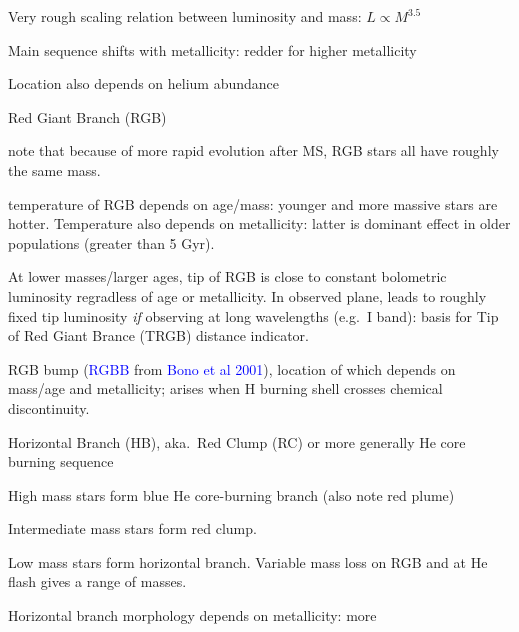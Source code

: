 \documentclass[12pt]{article}
\begin{document}
\begin{itemize*}
        \begin{itemize*}
            \item Very rough scaling relation between luminosity and mass:
                $ L \propto M^{3.5} $
            \item Main sequence shifts with metallicity: redder for
                higher metallicity
            \item Location also depends on helium abundance
        \end{itemize*}
    \item Red Giant Branch (RGB)
        \begin{itemize*}
            \item note that because of more rapid evolution after MS,
                RGB stars all have roughly the same mass.
            \item temperature of RGB depends on age/mass: younger and more
                massive stars are hotter. Temperature also depends on
                metallicity: latter is dominant effect in older populations
                (greater than 5 Gyr).
            \item At lower masses/larger ages, tip of RGB is close to
                constant bolometric luminosity regradless of age or
                metallicity. In observed plane, leads to roughly fixed
                tip luminosity \emph{if} observing at long wavelengths
                (e.g.\ I band): basis for Tip of Red Giant Brance (TRGB)
                distance indicator.
            \item RGB bump (\textcolor{blue}{RGBB} from
                \textcolor{blue}{Bono et al 2001}),
                location of which depends on mass/age and metallicity;
                arises when H burning shell crosses chemical discontinuity.
        \end{itemize*}
    \item Horizontal Branch (HB), aka.\ Red Clump (RC) or more generally
        He core burning sequence
        \begin{itemize*}
            \item High mass stars form blue He core-burning branch
                (also note red plume)
            \item Intermediate mass stars form red clump.
            \item Low mass stars form horizontal branch. Variable mass loss
                on RGB and at He flash gives a range of masses.
            \item Horizontal branch morphology depends on metallicity: more

\end{itemize*}
\end{itemize*}
\end{document}
